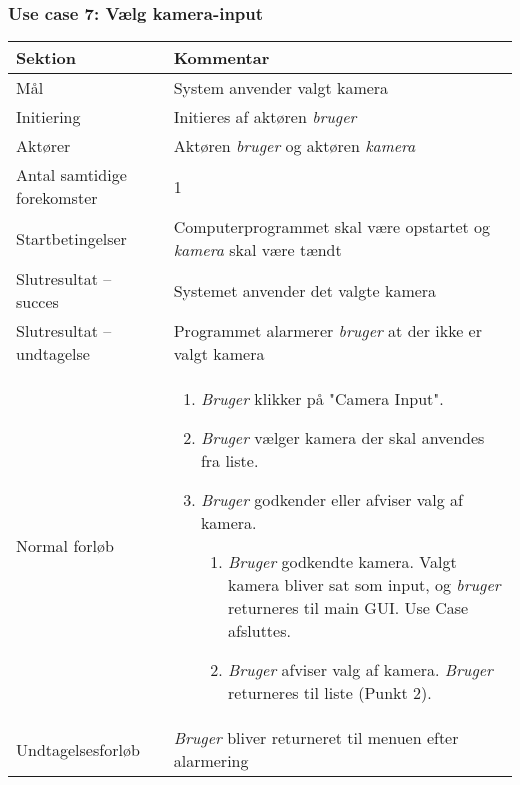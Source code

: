 \documentclass[kravspec.tex]{subfiles}
\begin{document}
	\subsubsection{Use case 7: Vælg kamera-input}
	\begin{tabular}{|l|p{7.7cm}|}
		\hline \textbf{Sektion} 	& \textbf{Kommentar} \\ 
		\hline Mål  & System anvender valgt kamera \\ 
		\hline Initiering  & Initieres af aktøren \textit{bruger} \\ 
		\hline Aktører & Aktøren \textit{bruger} og aktøren \textit{kamera} \\ 
		\hline Antal samtidige forekomster & 1 \\ 
		\hline Startbetingelser & Computerprogrammet skal være opstartet og \textit{kamera} skal være tændt  \\ 
		\hline Slutresultat – succes & Systemet anvender det valgte kamera \\ 
		\hline Slutresultat – undtagelse & Programmet alarmerer \textit{bruger} at der ikke er valgt kamera \\ 
		\hline Normal forløb & \begin{enumerate}
			\item \textit{Bruger} klikker på "Camera Input".
			\item \textit{Bruger} vælger kamera der skal anvendes fra liste.
			\item \textit{Bruger} godkender eller afviser valg af kamera.
			\begin{enumerate}
			\item \textit{Bruger} godkendte kamera. Valgt kamera bliver sat som input, og \textit{bruger} returneres til main GUI. Use Case afsluttes.
			\item \textit{Bruger} afviser valg af kamera. \textit{Bruger} returneres til liste (Punkt 2).
			\end{enumerate}
		\end{enumerate} \\ 
		\hline Undtagelsesforløb & \textit{Bruger} bliver returneret til menuen efter alarmering \\ 
		\hline 
	\end{tabular}
	
\end{document}
